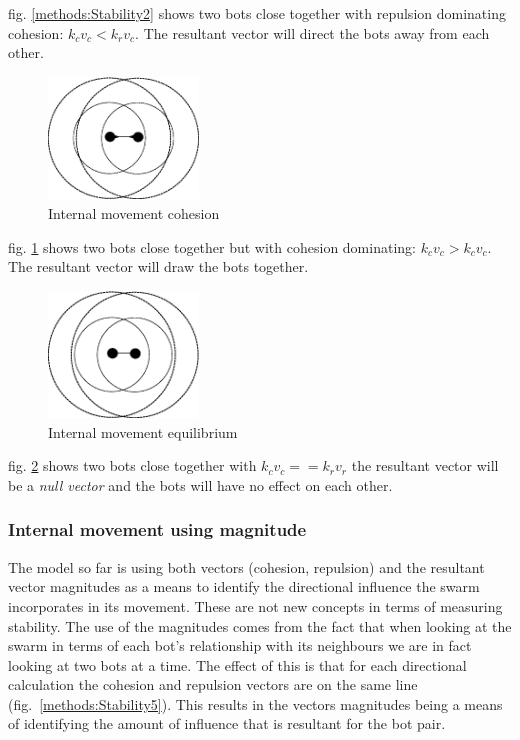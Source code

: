 \documentclass[10pt,journal,letterpaper,twoside]{IEEEtran}
\newcommand{\Stability}{Internal movement}
\newcommand{\Fig}{fig.}
\begin{document}
\Fig{} \ref{methods:Stability2} shows two bots close together with
repulsion dominating cohesion: $k_cv_c < k_rv_c$. The resultant vector
will direct the bots away from each other.

\begin{figure}[H]
\begin{center}
\includegraphics[width=4cm]{figures/Stability3}
\end{center}
\caption{\Stability{} cohesion} \label{methods:Stability3}
\end{figure}

\Fig{} \ref{methods:Stability3} shows two bots close together but with
cohesion dominating: $k_cv_c > k_cv_c$. The resultant vector will draw
the bots together.

\begin{figure}[H]
\begin{center}
\includegraphics[width=4cm]{figures/Stability4}
\end{center}
\caption{\Stability{} equilibrium} \label{methods:Stability4}
\end{figure}

\Fig{} \ref{methods:Stability4} shows two bots close together with
$k_cv_c == k_rv_r$ the resultant vector will be a \textit{null vector}
and the bots will have no effect on each other.

\subsubsection{\Stability{} using magnitude}\label{Section:StabilityMagnatude}

The model so far is using both vectors (cohesion, repulsion) and the
resultant vector magnitudes as a means to identify the directional
influence the swarm incorporates in its movement. These are not new
concepts in terms of measuring stability. The use of the magnitudes
comes from the fact that when looking at the swarm in terms of each
bot's relationship with its neighbours we are in fact looking at two
bots at a time. The effect of this is that for each directional
calculation the cohesion and repulsion vectors are on the same line
(\Fig{}~\ref{methods:Stability5}). This results in the vectors
magnitudes being a means of identifying the amount of influence that
is resultant for the bot pair.
\end{document}
